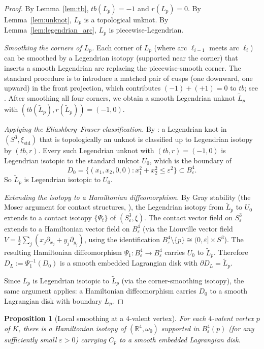 \documentclass[12pt]{article}
\newtheorem{proposition}[theorem]{Proposition}
\theoremstyle{definition}
\newcommand{\R}{\mathbb{R}}
\newcommand{\om}{\omega}
\newcommand{\eps}{\varepsilon}
\begin{document}
\begin{proof}
By Lemma~\ref{lem:tb}, $tb(L_p)=-1$ and $r(L_p)=0$.  By
Lemma~\ref{lem:unknot}, $L_p$ is a topological unknot.  By Lemma~\ref{lem:legendrian_arc}, $L_p$ is piecewise-Legendrian.

\emph{Smoothing the corners of $L_p$.}
Each corner of $L_p$ (where arc $\ell_{i-1}$ meets arc $\ell_i$) can be
smoothed by a Legendrian isotopy (supported near the corner) that inserts
a smooth Legendrian arc replacing the piecewise-smooth corner.  The
standard procedure is to introduce a matched pair of cusps (one downward,
one upward) in the front projection, which contributes $(-1)+(+1)=0$ to
$tb$; see \cite[Lemma~7.3.1]{Et03}.  After smoothing all four corners, we
obtain a smooth Legendrian unknot $\tilde{L}_p$ with
$(tb(\tilde{L}_p),r(\tilde{L}_p))=(-1,0)$.

\emph{Applying the Eliashberg--Fraser classification.}
By \cite[Theorem~1.2]{EF09}: a Legendrian knot in $(S^3,\xi_{\mathrm{std}})$
that is topologically an unknot is classified up to Legendrian isotopy by
$(tb,r)$.  Every such Legendrian unknot with $(tb,r)=(-1,0)$ is Legendrian
isotopic to the standard unknot $U_0$, which is the boundary of
\[
  D_0=\{(x_1,x_2,0,0):x_1^2+x_2^2\le\eps^2\}\subset B^4_\eps.
\]
So $\tilde{L}_p$ is Legendrian isotopic to $U_0$.

\emph{Extending the isotopy to a Hamiltonian diffeomorphism.}
By Gray stability (the Moser argument for contact structures,
\cite[Theorem~2.2.2]{Ge08}), the Legendrian isotopy from $\tilde{L}_p$ to
$U_0$ extends to a contact isotopy $\{\Psi_t\}$ of $(S^3_\eps,\xi)$.  The
contact vector field on $S^3_\eps$ extends to a Hamiltonian vector field
on $B^4_\eps$ (via the Liouville vector field $V=\frac{1}{2}\sum_j
(x_j\partial_{x_j}+y_j\partial_{y_j})$, using the identification
$B^4_\eps\setminus\{p\}\cong(0,\eps]\times S^3$).  The resulting
Hamiltonian diffeomorphism $\Psi_1:B^4_\eps\to B^4_\eps$ carries $U_0$
to $\tilde{L}_p$.  Therefore $D_L:=\Psi_1^{-1}(D_0)$ is a smooth embedded
Lagrangian disk with $\partial D_L=\tilde{L}_p$.

Since $L_p$ is Legendrian isotopic to $\tilde{L}_p$ (via the corner-smoothing
isotopy), the same argument applies: a Hamiltonian diffeomorphism carries
$D_0$ to a smooth Lagrangian disk with boundary $L_p$.
\end{proof}

\begin{proposition}[Local smoothing at a $4$-valent vertex]\label{prop:local}
For each $4$-valent vertex $p$ of $K$, there is a Hamiltonian isotopy of
$(\R^4,\om_0)$ supported in $B^4_\eps(p)$ (for any sufficiently small
$\eps>0$) carrying $C_p$ to a smooth embedded Lagrangian disk.
\end{proposition}
\end{document}
